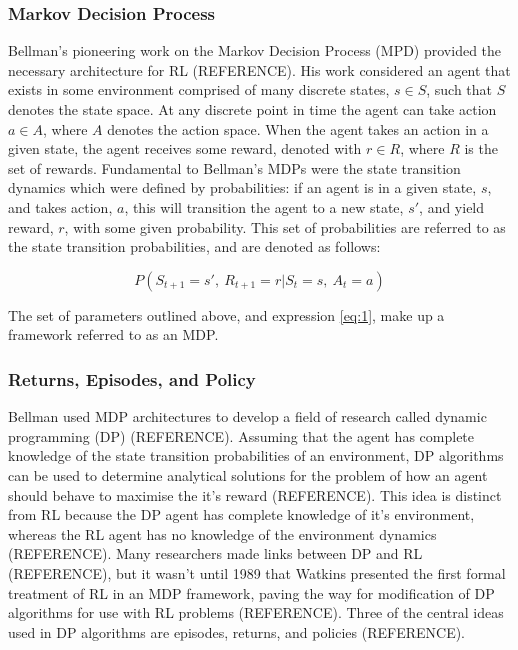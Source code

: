 \subsubsection{Markov Decision Process}
Bellman's pioneering work on the Markov Decision Process (MPD) provided the necessary architecture for RL (REFERENCE). His work considered an agent that exists in some environment comprised of many discrete states, $s \in S$, such that $S$ denotes the state space. At any discrete point in time the agent can take action $a \in A$, where $A$ denotes the action space. When the agent takes an action in a given state, the agent receives some reward, denoted with $r \in R$, where $R$ is the set of rewards. Fundamental to Bellman's MDPs were the state transition dynamics which were defined by probabilities: if an agent is in a given state, $s$, and takes action, $a$, this will transition the agent to a new state, $s'$, and yield reward, $r$, with some given probability. This set of probabilities are referred to as the state transition probabilities, and are denoted as follows:

\begin{equation}
	P(S_{t+1} = s', \ R_{t+1} = r | S_t = s, \ A_t = a) \label{eq:1}
\end{equation}

The set of parameters outlined above, and expression \ref{eq:1}, make up a framework referred to as an MDP.

\subsubsection{Returns, Episodes, and Policy}
Bellman used MDP architectures to develop a field of research called dynamic programming (DP) (REFERENCE). Assuming that the agent has complete knowledge of the state transition probabilities of an environment, DP algorithms can be used to determine analytical solutions for the problem of how an agent should behave to maximise the it's reward (REFERENCE). This idea is distinct from RL because the DP agent has complete knowledge of it's environment, whereas the RL agent has no knowledge of the environment dynamics (REFERENCE). Many researchers made links between DP and RL (REFERENCE), but it wasn't until 1989 that Watkins presented the first formal treatment of RL in an MDP framework, paving the way for modification of DP algorithms for use with RL problems (REFERENCE). Three of the central ideas used in DP algorithms are episodes, returns, and policies (REFERENCE).

